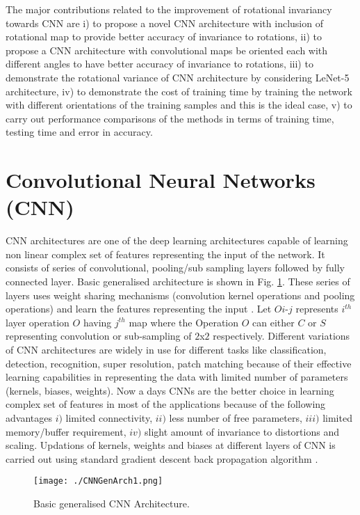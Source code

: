 The major contributions related to the improvement of rotational invariancy towards CNN are i) to propose a novel CNN architecture with inclusion of rotational map to provide better accuracy of invariance to rotations, ii) to propose a CNN architecture with convolutional maps be oriented each with different angles to have better accuracy of invariance to rotations, iii) to demonstrate the rotational variance of CNN architecture by considering LeNet-5 architecture, iv) to demonstrate the cost of training time by training the network with different orientations of the training samples and this is the ideal case, v) to carry out performance comparisons of the methods in terms of training time, testing time and error in accuracy. \\


\section{Convolutional Neural Networks (CNN)} 
	\label{BasicGenCNNArch}
	CNN architectures are one of the deep learning architectures capable of learning non linear complex set of features representing the input of the network. It consists of series of convolutional, pooling/sub sampling layers followed by fully connected layer. Basic generalised architecture is shown in Fig. \ref{Fig:GCNN}. These series of layers uses weight sharing mechanisms (convolution kernel operations and pooling operations) and learn the features representing the input \cite{P1}\cite{P2}\cite{P3}. Let $ Oi$-$j$ represents $i^{th}$ layer operation $O$ having $j^{th}$ map where the Operation $O$ can either $C$ or $S$ representing convolution or sub-sampling of $2$x$2$ respectively. Different variations of CNN architectures are widely in use for different tasks like classification, detection, recognition, super resolution, patch matching because of their effective learning capabilities in representing the data with limited number of parameters (kernels, biases, weights). Now a days CNNs are the better choice in learning complex set of features in most of the applications because of the following advantages $i)$ limited connectivity, $ii)$ less number of free parameters, $iii)$ limited memory/buffer requirement, $iv)$ slight amount of invariance to distortions and scaling. Updations of kernels, weights and biases at different layers of CNN is carried out using standard gradient descent back propagation algorithm \cite{P14} \cite{RCNN15}.

\begin{figure}[h]
 \centering
 \texttt{[image: ./CNNGenArch1.png]}
 \caption{Basic generalised CNN Architecture.}
 \label{Fig:GCNN}
\end{figure}

